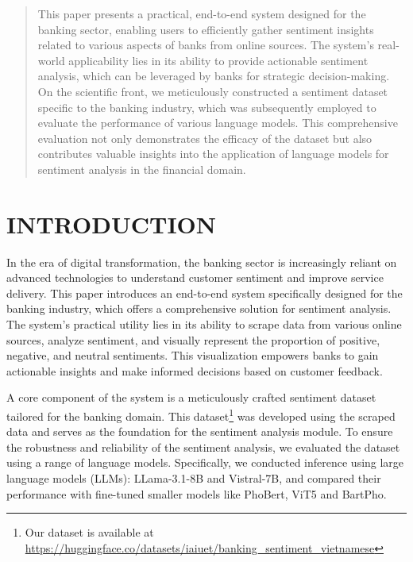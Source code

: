 {\cn

\begin{abstract}
This paper presents a practical, end-to-end system designed for the banking sector, enabling users to efficiently gather sentiment insights related to various aspects of banks from online sources. The system's real-world applicability lies in its ability to provide actionable sentiment analysis, which can be leveraged by banks for strategic decision-making. On the scientific front, we meticulously constructed a sentiment dataset specific to the banking industry, which was subsequently employed to evaluate the performance of various language models. This comprehensive evaluation not only demonstrates the efficacy of the dataset but also contributes valuable insights into the application of language models for sentiment analysis in the financial domain. 
\end{abstract}


\section{INTRODUCTION}

In the era of digital transformation, the banking sector is increasingly reliant on advanced technologies to understand customer sentiment and improve service delivery. This paper introduces an end-to-end system specifically designed for the banking industry, which offers a comprehensive solution for sentiment analysis. The system's practical utility lies in its ability to scrape data from various online sources, analyze sentiment, and visually represent the proportion of positive, negative, and neutral sentiments. This visualization empowers banks to gain actionable insights and make informed decisions based on customer feedback.

A core component of the system is a meticulously crafted sentiment dataset tailored for the banking domain. This dataset\footnote{Our dataset is available at \url{https://huggingface.co/datasets/iaiuet/banking_sentiment_vietnamese}} was developed using the scraped data and serves as the foundation for the sentiment analysis module. To ensure the robustness and reliability of the sentiment analysis, we evaluated the dataset using a range of language models. Specifically, we conducted inference using large language models (LLMs): LLama-3.1-8B\cite{dubey2024llama3herdmodels} and Vistral-7B\cite{chien2023vistral}, and compared their performance with fine-tuned smaller models like PhoBert\cite{phobert}, ViT5\cite{phan-etal-2022-vit5} and BartPho\cite{bartpho}.

}
